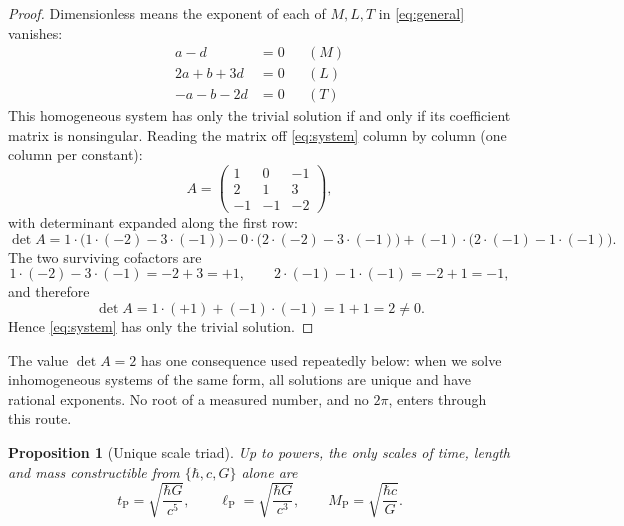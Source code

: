 \documentclass[11pt]{amsbook}
\theoremstyle{plain}
\newtheorem{proposition}[theorem]{Proposition}
\theoremstyle{definition}
\theoremstyle{remark}
\newcommand{\uses}[1]{\par\nopagebreak\noindent{\footnotesize\emph{Uses: #1.}\par}}
\begin{document}
\begin{proof}
Dimensionless means the exponent of each of $M, L, T$ in \cref{eq:general} vanishes:
\begin{equation}\label{eq:system}
\begin{aligned}
a - d &= 0 && (M)\\
2a + b + 3d &= 0 && (L)\\
-a - b - 2d &= 0 && (T)
\end{aligned}
\end{equation}
This homogeneous system has only the trivial solution if and only if its coefficient matrix is nonsingular. Reading the matrix off \cref{eq:system} column by column (one column per constant):
\begin{equation}\label{eq:matrix}
A = \begin{pmatrix}
1 & 0 & -1\\
2 & 1 & 3\\
-1 & -1 & -2
\end{pmatrix},
\end{equation}
with determinant expanded along the first row:
\begin{equation}\label{eq:detexpand}
\det A
= 1\cdot\bigl(1\cdot(-2) - 3\cdot(-1)\bigr)
- 0\cdot\bigl(2\cdot(-2) - 3\cdot(-1)\bigr)
+ (-1)\cdot\bigl(2\cdot(-1) - 1\cdot(-1)\bigr).
\end{equation}
The two surviving cofactors are
\begin{equation}\label{eq:cofactors}
1\cdot(-2) - 3\cdot(-1) = -2 + 3 = +1,
\qquad
2\cdot(-1) - 1\cdot(-1) = -2 + 1 = -1,
\end{equation}
and therefore
\begin{equation}\label{eq:det}
\det A = 1\cdot(+1) + (-1)\cdot(-1) = 1 + 1 = 2 \neq 0.
\end{equation}
Hence \cref{eq:system} has only the trivial solution.
\end{proof}

The value $\det A = 2$ has one consequence used repeatedly below: when we solve inhomogeneous systems of the same form, all solutions are unique and have rational exponents. No root of a measured number, and no $2\pi$, enters through this route.

\begin{proposition}[Unique scale triad]\label{prop:triad}
Up to powers, the only scales of time, length and mass constructible from $\{\hbar, c, G\}$ alone are
\begin{equation}\label{eq:triad}
t_{\mathrm P} = \sqrt{\frac{\hbar G}{c^{5}}},\qquad
\ell_{\mathrm P} = \sqrt{\frac{\hbar G}{c^{3}}},\qquad
M_{\mathrm P} = \sqrt{\frac{\hbar c}{G}}.
\end{equation}
\uses{\cref{lem:dim}}
\end{proposition}
\end{document}
